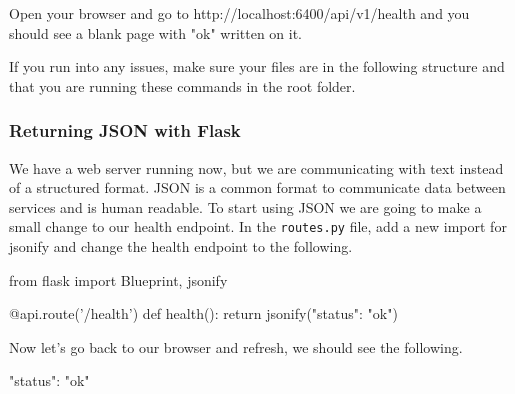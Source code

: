 \documentclass{csse4400}
\begin{document}
Open your browser and go to http://localhost:6400/api/v1/health and you should see a blank page with "ok" written on it.


If you run into any issues, make sure your files are in the following structure and that you are running these commands in the root folder.

\vspace{0.5em}
\begin{minipage}{\textwidth}
\end{minipage}


\subsubsection{Returning JSON with Flask}

We have a web server running now, but we are communicating with text instead of a structured format.
JSON is a common format to communicate data between services and is human readable.
To start using JSON we are going to make a small change to our health endpoint.
In the \texttt{routes.py} file, add a new import for jsonify and change the health endpoint to the following.

\begin{code}[language=python]{}
  from flask import Blueprint, jsonify
\end{code}

\begin{code}[language=python,firstnumber=6]{}
  @api.route('/health')
  def health():
      return jsonify({"status": "ok"})
\end{code}

Now let's go back to our browser and refresh, we should see the following.

\begin{code}[language=json,numbers=none]{}
  {
    "status": "ok"
  }
\end{code}

\end{document}
